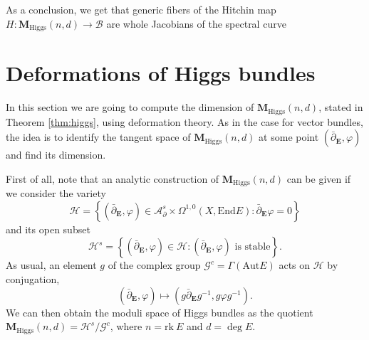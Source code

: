 \documentclass[12pt,a4paper]{book}
\theoremstyle{definition} \newtheorem{defn}[thm]{Definition}
\theoremstyle{definition} \newtheorem{ejemplo}[thm]{Example}
\theoremstyle{remark} \newtheorem{rem}[thm]{Remark}
\def\AA{\mathscr{A}}
\def\BB{\mathscr{B}}
\def\HH{\mathscr{H}}
\def\GG{\mathscr{G}}
\def\rk{\mathrm{rk}}
\def\End{\mathrm{End}}
\def\Aut{\mathrm{Aut}}
\def\Hig{\mathbf{M}_{\mathrm{Higgs}}}
\def\delbar{\bar{\partial}}
\newcommand{\ve}[1]{\mathbf{#1}}
\begin{document}
	    As a conclusion, we get that generic fibers of the Hitchin map $H:\Hig(n,d) \rightarrow \BB$ are whole Jacobians of the spectral curve

	    \section{Deformations of Higgs bundles}
	    In this section we are going to compute the dimension of $\Hig(n,d)$, stated in Theorem \ref{thm:higgs}, using deformation theory. As in the case for vector bundles, the idea is to identify the tangent space of $\Hig(n,d)$ at some point $(\delbar_{\ve{E}},\varphi)$ and find its dimension.

	    First of all, note that an analytic construction of $\Hig(n,d)$ can be given if we consider the variety
	    \begin{equation*}
	     \HH= \left\{(\delbar_{\ve{E}},\varphi) \in\AA^s_\partial \times \Omega^{1,0}(X,\End E) : \delbar_{\ve{E}}\varphi=0 \right\}
	    \end{equation*}
	    and its open subset
	    \begin{equation*}
	      \HH^s=\left\{ (\delbar_{\ve{E}},\varphi) \in \HH : (\delbar_{\ve{E}},\varphi) \text{ is stable} \right\}      .
	    \end{equation*}
	    As usual, an element $g$ of the complex group $\GG^c=\Gamma(\Aut E)$ acts on $\HH$ by conjugation,
	    \begin{equation*}
	      (\delbar_{\ve{E}},\varphi) \mapsto (g\delbar_{\ve{E}}g^{-1},g\varphi g^{-1}).
	    \end{equation*}
	    We can then obtain the moduli space of Higgs bundles as the quotient $\Hig(n,d)=\HH^s/\GG^c$, where $n=\rk\ E$ and $d= \deg E$.
\end{document}

